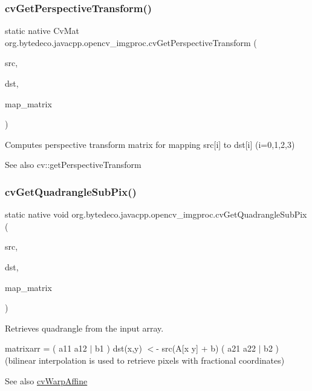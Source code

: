 \subsubsection{\texorpdfstring{cv\+Get\+Perspective\+Transform()}{cvGetPerspectiveTransform()}}
{\footnotesize\ttfamily static native Cv\+Mat org.\+bytedeco.\+javacpp.\+opencv\+\_\+imgproc.\+cv\+Get\+Perspective\+Transform (\begin{DoxyParamCaption}\item[{@Const Cv\+Point2\+D32f}]{src,  }\item[{@Const Cv\+Point2\+D32f}]{dst,  }\item[{Cv\+Mat}]{map\+\_\+matrix }\end{DoxyParamCaption})\hspace{0.3cm}{\ttfamily [static]}}



Computes perspective transform matrix for mapping src\mbox{[}i\mbox{]} to dst\mbox{[}i\mbox{]} (i=0,1,2,3) 

\begin{DoxySeeAlso}{See also}
cv\+::get\+Perspective\+Transform 
\end{DoxySeeAlso}
\mbox{\label{group__imgproc__c_gafb07651da746782b1b92bce7179079e1}} 
\subsubsection{\texorpdfstring{cv\+Get\+Quadrangle\+Sub\+Pix()}{cvGetQuadrangleSubPix()}}
{\footnotesize\ttfamily static native void org.\+bytedeco.\+javacpp.\+opencv\+\_\+imgproc.\+cv\+Get\+Quadrangle\+Sub\+Pix (\begin{DoxyParamCaption}\item[{@Const Cv\+Arr}]{src,  }\item[{Cv\+Arr}]{dst,  }\item[{@Const Cv\+Mat}]{map\+\_\+matrix }\end{DoxyParamCaption})\hspace{0.3cm}{\ttfamily [static]}}



Retrieves quadrangle from the input array. 

matrixarr = ( a11 a12 $\vert$ b1 ) dst(x,y) $<$-\/ src(A\mbox{[}x y\mbox{]}\textquotesingle{} + b) ( a21 a22 $\vert$ b2 ) (bilinear interpolation is used to retrieve pixels with fractional coordinates) \begin{DoxySeeAlso}{See also}
\hyperlink{group__imgproc__c_gabf1cb9d4218222026652e60bea3c8b17}{cv\+Warp\+Affine} 
\end{DoxySeeAlso}
\mbox{\label{group__imgproc__c_gafdd84b3138aa7fa919555c124ccd6c0c}} 
